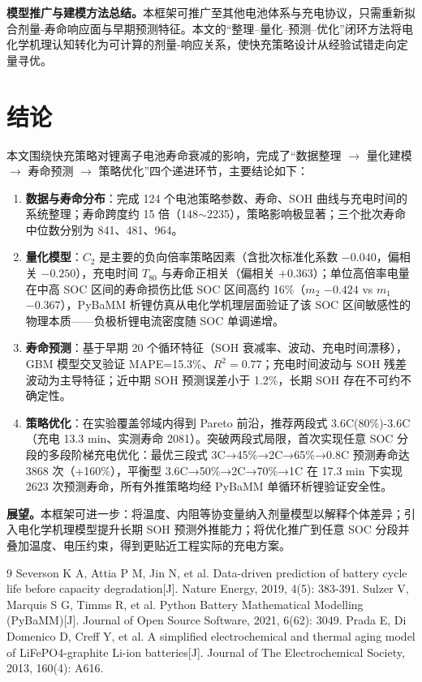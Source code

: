 \documentclass[withoutpreface]{cumcmthesis}
\begin{document}
\textbf{模型推广与建模方法总结。}本框架可推广至其他电池体系与充电协议，只需重新拟合剂量-寿命响应面与早期预测特征。本文的“整理--量化--预测--优化”闭环方法将电化学机理认知转化为可计算的剂量-响应关系，使快充策略设计从经验试错走向定量寻优。

\section{结论}

本文围绕快充策略对锂离子电池寿命衰减的影响，完成了“数据整理 $\rightarrow$ 量化建模 $\rightarrow$ 寿命预测 $\rightarrow$ 策略优化”四个递进环节，主要结论如下：

\begin{enumerate}
\item \textbf{数据与寿命分布}：完成 124 个电池策略参数、寿命、SOH 曲线与充电时间的系统整理；寿命跨度约 15 倍（148$\sim$2235），策略影响极显著；三个批次寿命中位数分别为 841、481、964。
\item \textbf{量化模型}：$C_2$ 是主要的负向倍率策略因素（含批次标准化系数 $-0.040$，偏相关 $-0.250$），充电时间 $T_{80}$ 与寿命正相关（偏相关 $+0.363$）；单位高倍率电量在中高 SOC 区间的寿命损伤比低 SOC 区间高约 16\%（$m_2$ $-0.424$ vs $m_1$ $-0.367$），PyBaMM 析锂仿真从电化学机理层面验证了该 SOC 区间敏感性的物理本质——负极析锂电流密度随 SOC 单调递增。
\item \textbf{寿命预测}：基于早期 20 个循环特征（SOH 衰减率、波动、充电时间漂移），GBM 模型交叉验证 MAPE=15.3\%、$R^2=0.77$；充电时间波动与 SOH 残差波动为主导特征；近中期 SOH 预测误差小于 1.2\%，长期 SOH 存在不可约不确定性。
\item \textbf{策略优化}：在实验覆盖邻域内得到 Pareto 前沿，推荐两段式 3.6C(80\%)-3.6C（充电 13.3 min、实测寿命 2081）。突破两段式局限，首次实现任意 SOC 分段的多段阶梯充电优化：最优三段式 3C→45\%→2C→65\%→0.8C 预测寿命达 3868 次（+160\%），平衡型 3.6C→50\%→2C→70\%→1C 在 17.3 min 下实现 2623 次预测寿命，所有外推策略均经 PyBaMM 单循环析锂验证安全性。
\end{enumerate}

\textbf{展望。}本框架可进一步：将温度、内阻等协变量纳入剂量模型以解释个体差异；引入电化学机理模型提升长期 SOH 预测外推能力；将优化推广到任意 SOC 分段并叠加温度、电压约束，得到更贴近工程实际的充电方案。

\begin{thebibliography}{9}
 Severson K A, Attia P M, Jin N, et al. Data-driven prediction of battery cycle life before capacity degradation[J]. Nature Energy, 2019, 4(5): 383-391.
 Sulzer V, Marquis S G, Timms R, et al. Python Battery Mathematical Modelling (PyBaMM)[J]. Journal of Open Source Software, 2021, 6(62): 3049.
 Prada E, Di Domenico D, Creff Y, et al. A simplified electrochemical and thermal aging model of LiFePO4-graphite Li-ion batteries[J]. Journal of The Electrochemical Society, 2013, 160(4): A616.
\end{thebibliography}
\end{document}
